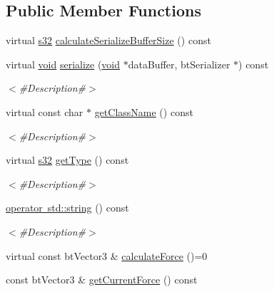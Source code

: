 \subsection*{Public Member Functions}
\begin{DoxyCompactItemize}
\item 
virtual \mbox{\hyperlink{_util_8h_aa62c75d314a0d1f37f79c4b73b2292e2}{s32}} \mbox{\hyperlink{classnjli_1_1_steering_behavior_abbc461d853c1b225cfde5b79d96d11bd}{calculate\+Serialize\+Buffer\+Size}} () const
\item 
virtual \mbox{\hyperlink{_thread_8h_af1e856da2e658414cb2456cb6f7ebc66}{void}} \mbox{\hyperlink{classnjli_1_1_steering_behavior_aa8494cb4a327c0040f64cfe8b393786e}{serialize}} (\mbox{\hyperlink{_thread_8h_af1e856da2e658414cb2456cb6f7ebc66}{void}} $\ast$data\+Buffer, bt\+Serializer $\ast$) const
\begin{DoxyCompactList}\small\item\em $<$\#\+Description\#$>$ \end{DoxyCompactList}\item 
virtual const char $\ast$ \mbox{\hyperlink{classnjli_1_1_steering_behavior_abb58d6982dc295fc3e90f096f51b0ef8}{get\+Class\+Name}} () const
\begin{DoxyCompactList}\small\item\em $<$\#\+Description\#$>$ \end{DoxyCompactList}\item 
virtual \mbox{\hyperlink{_util_8h_aa62c75d314a0d1f37f79c4b73b2292e2}{s32}} \mbox{\hyperlink{classnjli_1_1_steering_behavior_ae82bca8468d41aff8c22b76fd359fe9b}{get\+Type}} () const
\begin{DoxyCompactList}\small\item\em $<$\#\+Description\#$>$ \end{DoxyCompactList}\item 
\mbox{\hyperlink{classnjli_1_1_steering_behavior_acd7af46e42a8a3fc1208a47f50836ac8}{operator std\+::string}} () const
\begin{DoxyCompactList}\small\item\em $<$\#\+Description\#$>$ \end{DoxyCompactList}\item 
virtual const bt\+Vector3 \& \mbox{\hyperlink{classnjli_1_1_steering_behavior_a9720953de1268f658636213946d76ed3}{calculate\+Force}} ()=0
\item 
const bt\+Vector3 \& \mbox{\hyperlink{classnjli_1_1_steering_behavior_a4e79ade4c061f79de526f05a529317d0}{get\+Current\+Force}} () const

\end{DoxyCompactItemize}
